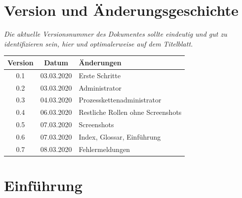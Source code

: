\documentclass[enabledeprecatedfontcommands,fontsize=12pt,paper=a4,twoside]{scrartcl}
\begin{document}


\newpage

  \thispagestyle{fancy}
  \fancyhead{}
  \fancyfoot{}
  \renewcommand{\headrulewidth}{0.4pt}
  \tableofcontents

\newpage





\section*{Version und Änderungsgeschichte}

{\em Die aktuelle Versionsnummer des Dokumentes sollte eindeutig und gut zu
identifizieren sein, hier und optimalerweise auf dem Titelblatt.}

\begin{tabular}{ccl}
Version & Datum & Änderungen \\
\hline
0.1 & 03.03.2020 & Erste Schritte \\
0.2 & 03.03.2020 & Administrator \\
0.3 & 04.03.2020 & Prozesskettenadministrator \\
0.4 & 06.03.2020 & Restliche Rollen ohne Screenshots \\
0.5 & 07.03.2020 & Screenshots \\
0.6 & 07.03.2020 & Index, Glossar, Einführung \\
0.7 & 08.03.2020 & Fehlermeldungen \\
\end{tabular}


\newpage
\section{Einführung}
\end{document}
